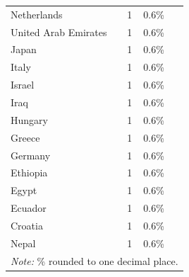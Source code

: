 \begin{table}[!t]
\begin{tabular}{p{3cm} p{3cm} p{3cm} p{3cm}}
Netherlands & 1 & 0.6\% & \cite{Benoist_2019e} \\
United Arab Emirates & 1 & 0.6\% & \cite{Ali_2020f} \\
Japan & 1 & 0.6\% & \cite{Ohno_2005} \\
Italy & 1 & 0.6\% & \cite{Riva_2018j} \\
Israel & 1 & 0.6\% & \cite{Goldman_1998f} \\
Iraq & 1 & 0.6\% & \cite{Al-Faham_2020k} \\
Hungary & 1 & 0.6\% & \cite{Csaky_1998e} \\
Greece & 1 & 0.6\% & \cite{Sakellaridis_2008f} \\
Germany & 1 & 0.6\% & \cite{teWildt_2010} \\
Ethiopia & 1 & 0.6\% & \cite{Mesfin_2022a} \\
Egypt & 1 & 0.6\% & \cite{Ali_2022g} \\
Ecuador & 1 & 0.6\% & \cite{DelgadoSalazar_2020c} \\
Croatia & 1 & 0.6\% & \cite{Trgo_2012f} \\
Nepal & 1 & 0.6\% & \cite{Thapa_2019f} \\
\bottomrule
\bottomrule
\multicolumn{4}{l}{\footnotesize\textit{Note:} \% rounded to one decimal place.}

\end{tabular}
\end{table}
